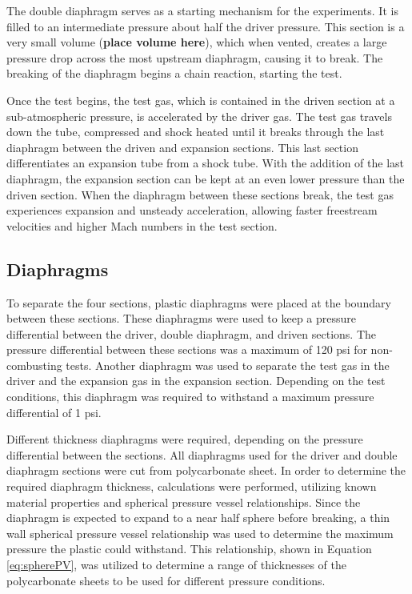 The double diaphragm serves as a starting mechanism for the experiments. It is filled to an intermediate pressure about half the driver pressure. This section is a very small volume (\textbf{place volume here}), which when vented, creates a large pressure drop across the most upstream diaphragm, causing it to break. The breaking of the diaphragm begins a chain reaction, starting the test. 

Once the test begins, the test gas, which is contained in the driven section at a sub-atmospheric pressure, is accelerated by the driver gas. The test gas travels down the tube, compressed and shock heated until it breaks through the last diaphragm between the driven and expansion sections. This last section differentiates an expansion tube from a shock tube. With the addition of the last diaphragm, the expansion section can be kept at an even lower pressure than the driven section. When the diaphragm between these sections break, the test gas experiences  expansion and unsteady acceleration, allowing faster freestream velocities and higher Mach numbers in the test section. 


\subsection{Diaphragms}
To separate the four sections, plastic diaphragms were placed at the boundary between these sections. These diaphragms were used to keep a pressure differential between the driver, double diaphragm, and driven sections. The pressure differential between these sections was a maximum of 120 psi for non-combusting tests. Another diaphragm was used to separate the test gas in the driver and the expansion gas in the expansion section. Depending on the test conditions, this diaphragm was required to withstand a maximum pressure differential of 1 psi. 

Different thickness diaphragms were required, depending on the pressure differential between the sections. All diaphragms used for the driver and double diaphragm sections were cut from polycarbonate sheet. In order to determine the required diaphragm thickness, calculations were performed, utilizing known material properties and spherical pressure vessel relationships. Since the diaphragm is expected to expand to a near half sphere before breaking, a thin wall spherical pressure vessel relationship was used to determine the maximum pressure the plastic could withstand. This relationship, shown in Equation \ref{eq:spherePV}, was utilized to determine a range of thicknesses of the polycarbonate sheets to be used for different pressure conditions. 

